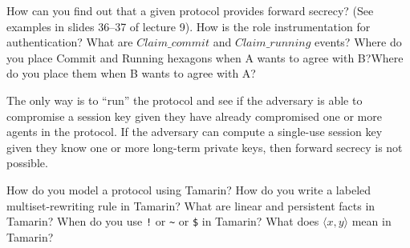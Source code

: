 \begin{questions}
\question{} How can you find out that a given protocol provides forward secrecy? (See examples in slides 36--37 of lecture 9).
\question{} How is the role instrumentation for authentication? What are $Claim\_commit$ and $Claim\_running$ events? Where do you place Commit and Running hexagons when A wants to agree with B?\@ Where do you place them when B wants to agree with A?\@
  \begin{solution}
    The only way is to ``run'' the protocol and see if the adversary is able to compromise a session key given they have already compromised one or more agents in the protocol.
    If the adversary can compute a single-use session key given they know one or more long-term private keys, then forward secrecy is not possible.
  \end{solution}

\question{} How do you model a protocol using Tamarin? How do you write a labeled multiset-rewriting rule in Tamarin?
\question{} What are linear and persistent facts in Tamarin? When do you use \texttt{!} or \texttt{\textasciitilde{}} or \texttt{\$} in Tamarin?
\question{} What does $\langle x, y \rangle$ mean in Tamarin?
\end{questions}
